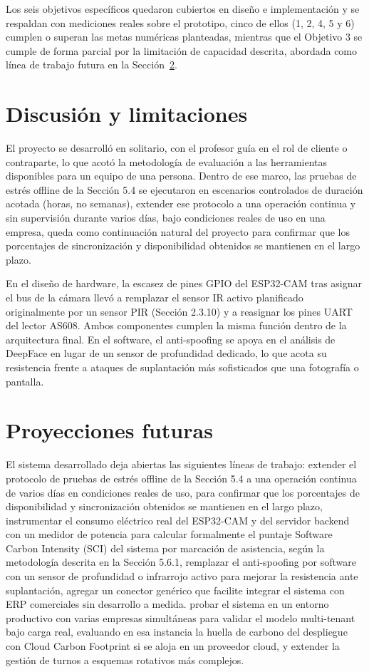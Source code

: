 \documentclass{iccmemoria}
\begin{document}
Los seis objetivos específicos quedaron cubiertos en diseño e implementación y se respaldan con mediciones reales sobre el prototipo, cinco de ellos (1, 2, 4, 5 y 6) cumplen o superan las metas numéricas planteadas, mientras que el Objetivo 3 se cumple de forma parcial por la limitación de capacidad descrita, abordada como línea de trabajo futura en la Sección~\ref{sec:proyecciones}.

\section{Discusión y limitaciones}
\label{sec:limitaciones}
El proyecto se desarrolló en solitario, con el profesor guía en el rol de cliente o contraparte, lo que acotó la metodología de evaluación a las herramientas disponibles para un equipo de una persona. Dentro de ese marco, las pruebas de estrés offline de la Sección 5.4 se ejecutaron en escenarios controlados de duración acotada (horas, no semanas), extender ese protocolo a una operación continua y sin supervisión durante varios días, bajo condiciones reales de uso en una empresa, queda como continuación natural del proyecto para confirmar que los porcentajes de sincronización y disponibilidad obtenidos se mantienen en el largo plazo.

En el diseño de hardware, la escasez de pines GPIO del ESP32-CAM tras asignar el bus de la cámara llevó a remplazar el sensor IR activo planificado originalmente por un sensor PIR (Sección 2.3.10) y a reasignar los pines UART del lector AS608. Ambos componentes cumplen la misma función dentro de la arquitectura final. En el software, el anti-spoofing se apoya en el análisis de DeepFace en lugar de un sensor de profundidad dedicado, lo que acota su resistencia frente a ataques de suplantación más sofisticados que una fotografía o pantalla.

\section{Proyecciones futuras}
\label{sec:proyecciones}
El sistema desarrollado deja abiertas las siguientes líneas de trabajo: extender el protocolo de pruebas de estrés offline de la Sección 5.4 a una operación continua de varios días en condiciones reales de uso, para confirmar que los porcentajes de disponibilidad y sincronización obtenidos se mantienen en el largo plazo, instrumentar el consumo eléctrico real del ESP32-CAM y del servidor backend con un medidor de potencia para calcular formalmente el puntaje Software Carbon Intensity (SCI) del sistema por marcación de asistencia, según la metodología descrita en la Sección 5.6.1, remplazar el anti-spoofing por software con un sensor de profundidad o infrarrojo activo para mejorar la resistencia ante suplantación, agregar un conector genérico que facilite integrar el sistema con ERP comerciales sin desarrollo a medida. probar el sistema en un entorno productivo con varias empresas simultáneas para validar el modelo multi-tenant bajo carga real, evaluando en esa instancia la huella de carbono del despliegue con Cloud Carbon Footprint si se aloja en un proveedor cloud, y extender la gestión de turnos a esquemas rotativos más complejos.
\end{document}
